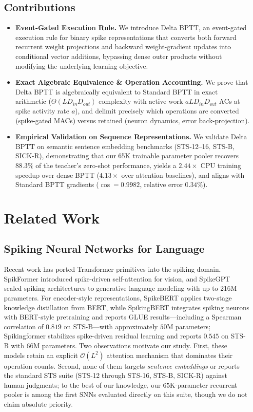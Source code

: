 \documentclass[10pt,journal,compsoc]{IEEEtran}
\begin{document}
\subsection{Contributions}
\begin{itemize}
    \item \textbf{Event-Gated Execution Rule.} We introduce Delta BPTT, an event-gated execution rule for binary spike representations that converts both forward recurrent weight projections and backward weight-gradient updates into conditional vector additions, bypassing dense outer products without modifying the underlying learning objective.
    \item \textbf{Exact Algebraic Equivalence \& Operation Accounting.} We prove that Delta BPTT is algebraically equivalent to Standard BPTT in exact arithmetic ($\Theta(L D_{in} D_{out})$ complexity with active work $a L D_{in} D_{out}$ ACs at spike activity rate $a$), and delimit precisely which operations are converted (spike-gated MACs) versus retained (neuron dynamics, error back-projection).
    \item \textbf{Empirical Validation on Sequence Representations.} We validate Delta BPTT on semantic sentence embedding benchmarks (STS-12--16, STS-B, SICK-R), demonstrating that our 65K trainable parameter pooler recovers $88.3\%$ of the teacher's zero-shot performance, yields a $2.44\times$ CPU training speedup over dense BPTT ($4.13\times$ over attention baselines), and aligns with Standard BPTT gradients ($\cos = 0.9982$, relative error $0.34\%$).
\end{itemize}

\section{Related Work}

\subsection{Spiking Neural Networks for Language}
Recent work has ported Transformer primitives into the spiking domain. SpikFormer \cite{zhou2023spikformer} introduced spike-driven self-attention for vision, and SpikeGPT \cite{zhu2023spikegpt} scaled spiking architectures to generative language modeling with up to 216M parameters. For encoder-style representations, SpikeBERT \cite{lv2023spikebert} applies two-stage knowledge distillation from BERT, while SpikingBERT \cite{bal2024spikingbert} integrates spiking neurons with BERT-style pretraining and reports GLUE results---including a Spearman correlation of $0.819$ on STS-B---with approximately $50$M parameters; Spikingformer \cite{zhou2025spikingformer} stabilizes spike-driven residual learning and reports $0.545$ on STS-B with $66$M parameters. Two observations motivate our study. First, these models retain an explicit $\mathcal{O}(L^2)$ attention mechanism that dominates their operation counts. Second, none of them targets \emph{sentence embeddings} or reports the standard STS suite (STS-12 through STS-16, STS-B, SICK-R) against human judgments; to the best of our knowledge, our $65$K-parameter recurrent pooler is among the first SNNs evaluated directly on this suite, though we do not claim absolute priority.
\end{document}
